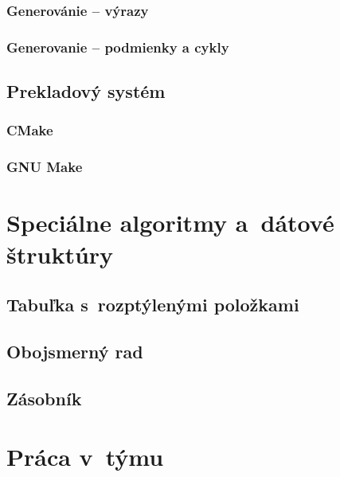 \documentclass[a4paper, 11pt]{article}
\begin{document}
    \subsubsection{Generovánie -- výrazy}


    \subsubsection{Generovanie -- podmienky a cykly}




    \subsection{Prekladový systém}


    \subsubsection{CMake}



    \subsubsection{GNU Make}




    \section{Speciálne algoritmy a~dátové štruktúry}

    \subsection{Tabuľka s~rozptýlenými položkami}

    \subsection{Obojsmerný rad}

    \subsection{Zásobník}





    \section{Práca v~týmu}
\end{document}
